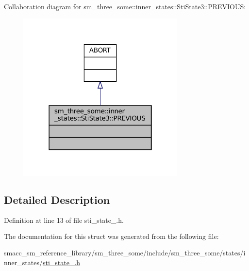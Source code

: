 Collaboration diagram for sm\+\_\+three\+\_\+some\+:\+:inner\+\_\+states\+:\+:Sti\+State3\+:\+:P\+R\+E\+V\+I\+O\+US\+:
\nopagebreak
\begin{figure}[H]
\begin{center}
\leavevmode
\includegraphics[width=238pt]{structsm__three__some_1_1inner__states_1_1StiState3_1_1PREVIOUS__coll__graph}
\end{center}
\end{figure}


\subsection{Detailed Description}


Definition at line 13 of file sti\+\_\+state\+\_.\+h.



The documentation for this struct was generated from the following file\+:\begin{DoxyCompactItemize}
\item 
smacc\+\_\+sm\+\_\+reference\+\_\+library/sm\+\_\+three\+\_\+some/include/sm\+\_\+three\+\_\+some/states/inner\+\_\+states/\hyperlink{sm__three__some_2include_2sm__three__some_2states_2inner__states_2sti__state__3_8h}{sti\+\_\+state\+\_.\+h}\end{DoxyCompactItemize}
